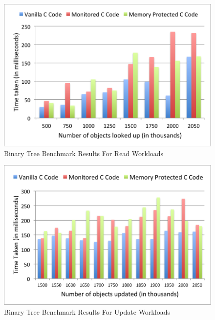 
\begin{figure}[!ht]
\caption{Binary Tree Benchmark Results For Read Workloads}
\label{fig:read}
\includegraphics[scale=0.5]{./images/read2.png}
\end{figure}

\begin{figure}[!h]
\caption{Binary Tree Benchmark Results For Update Workloads}
\label{fig:update}
\includegraphics[scale=0.5]{./images/update2.png}
\end{figure}
  

